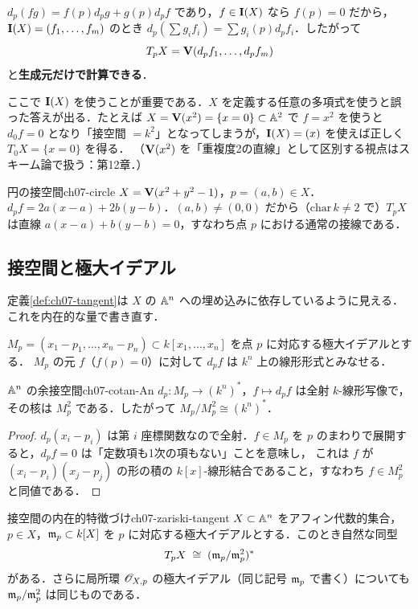 $d_p(fg)=f(p)d_pg+g(p)d_pf$ であり，$f\in\mathbf{I}(X)$ なら $f(p)=0$ だから，
$\mathbf{I}(X)=(f_1,\dots,f_m)$ のとき $d_p(\sum g_if_i)=\sum g_i(p)d_pf_i$．したがって
\[
  T_pX=\mathbf{V}(d_pf_1,\dots,d_pf_m)
\]
と\textbf{生成元だけで計算できる}．

\begin{note}
ここで $\mathbf{I}(X)$ を使うことが重要である．$X$ を定義する任意の多項式を使うと誤った答えが出る．たとえば $X=\mathbf{V}(x^2)=\{x=0\}\subset\mathbb{A}^2$ で $f=x^2$ を使うと
$d_0f=0$ となり「接空間 $=k^2$」となってしまうが，$\mathbf{I}(X)=(x)$ を使えば正しく $T_0X=\{x=0\}$ を得る．
（$\mathbf{V}(x^2)$ を「重複度2の直線」として区別する視点はスキーム論で扱う：第12章．）
\end{note}

\begin{myex}{円の接空間}{ch07-circle}
$X=\mathbf{V}(x^2+y^2-1)$，$p=(a,b)\in X$．$d_pf=2a(x-a)+2b(y-b)$．$(a,b)\neq(0,0)$ だから（$\mathrm{char}\,k\ne2$ で）$T_pX$ は直線 $a(x-a)+b(y-b)=0$，すなわち点 $p$ における通常の接線である．
\end{myex}

\subsection{接空間と極大イデアル}

定義\ref{def:ch07-tangent}は $X$ の $\mathbb{A}^n$ への埋め込みに依存しているように見える．これを内在的な量で書き直す．

$M_p=(x_1-p_1,\dots,x_n-p_n)\subset k[x_1,\dots,x_n]$ を点 $p$ に対応する極大イデアルとする．
$M_p$ の元 $f$（$f(p)=0$）に対して $d_pf$ は $k^n$ 上の線形形式とみなせる．

\begin{mylem}{$\mathbb{A}^n$ の余接空間}{ch07-cotan-An}
$d_p:M_p\to(k^n)^*$，$f\mapsto d_pf$ は全射 $k$-線形写像で，その核は $M_p^2$ である．したがって $M_p/M_p^2\cong(k^n)^*$．
\end{mylem}

\begin{proof}
$d_p(x_i-p_i)$ は第 $i$ 座標関数なので全射．$f\in M_p$ を $p$ のまわりで展開すると，$d_pf=0$ は「定数項も1次の項もない」ことを意味し，
これは $f$ が $(x_i-p_i)(x_j-p_j)$ の形の積の $k[x]$-線形結合であること，すなわち $f\in M_p^2$ と同値である．
\end{proof}

\begin{mythm}{接空間の内在的特徴づけ}{ch07-zariski-tangent}
$X\subset\mathbb{A}^n$ をアフィン代数的集合，$p\in X$，$\mathfrak{m}_p\subset k[X]$ を $p$ に対応する極大イデアルとする．このとき自然な同型
\[
  T_pX\;\cong\;(\mathfrak{m}_p/\mathfrak{m}_p^2)^*
\]
がある．さらに局所環 $\mathscr{O}_{X,p}$ の極大イデアル（同じ記号 $\mathfrak{m}_p$ で書く）についても $\mathfrak{m}_p/\mathfrak{m}_p^2$ は同じものである．
\end{mythm}

